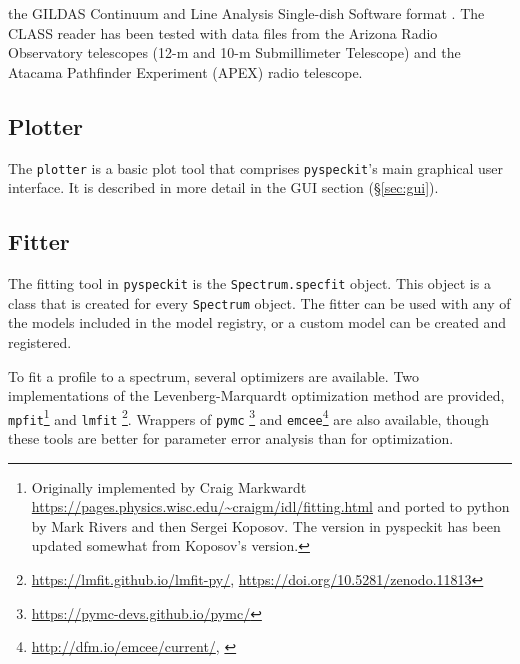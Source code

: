 \documentclass[twocolumn,linenumbers]{aastex63}
\newcommand{\pyspeckit}{\texttt{pyspeckit}\xspace}
\begin{document}
\begin{itemize}
        the GILDAS Continuum and Line Analysis Single-dish Software format
        \citep[CLASS;][]{Gildas-Team2013a}.  
        The CLASS reader has been tested with data files from
        the Arizona Radio Observatory telescopes (12-m and 10-m Submillimeter
        Telescope) and the Atacama Pathfinder Experiment (APEX) radio
        telescope.
\end{itemize}

\subsection{Plotter}
The \texttt{plotter} is a basic plot tool that comprises \pyspeckit's main
graphical user interface.
It is described in more detail in the  GUI section (\S \ref{sec:gui}).


\subsection{Fitter}
\label{sec:fitters}
The fitting tool in \pyspeckit is the \texttt{Spectrum.specfit} object.
This object is a class that is created for every \texttt{Spectrum} object.
The fitter can be used with any of the models included in the model
registry, or a custom model can be created and registered.

To fit a profile to a spectrum, several optimizers are available.  Two
implementations of the Levenberg-Marquardt optimization method
\citep{Levenberg1944a,Marquardt1963a} are provided,
\texttt{mpfit}\footnote{Originally implemented by Craig Markwardt \citet{Markwardt2009}
\url{https://pages.physics.wisc.edu/~craigm/idl/fitting.html} and ported to python
by Mark Rivers and then Sergei Koposov.  The version in pyspeckit has been
updated somewhat from Koposov's version.} and
\texttt{lmfit} \citep{Newville2014}\footnote{\url{https://lmfit.github.io/lmfit-py/},
\url{https://doi.org/10.5281/zenodo.11813}}.  Wrappers of
\texttt{pymc} \citep{Salvatier2016}\footnote{\url{https://pymc-devs.github.io/pymc/}} and
\texttt{emcee}\footnote{\url{http://dfm.io/emcee/current/},
\citet{Foreman-Mackey2013a}} are also available, though these tools are better
for parameter error analysis than for optimization.
\end{document}
